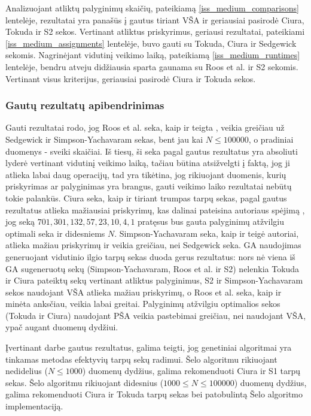 \documentclass{VUMIFInfKursinis}
\begin{document}
Analizuojant atliktų palyginimų skaičių, pateikiamą \ref{iss_medium_comparisons} lentelėje, rezultatai yra panašūs į gautus tiriant VŠA
ir geriausiai pasirodė Ciura, Tokuda ir S2 sekos.
Vertinant atliktus priskyrimus, geriausi rezultatai, pateikiami \ref{iss_medium_assignments} lentelėje, buvo gauti su Tokuda, Ciura ir Sedgewick sekomis.
Nagrinėjant vidutinį veikimo laiką, pateikiamą \ref{iss_medium_runtimes} lentelėje, bendru atveju didžiausia sparta gaunama su Roos et al. ir S2 sekomis.
Vertinant visus kriterijus, geriausiai pasirodė Ciura ir Tokuda sekos.

\subsubsection{Gautų rezultatų apibendrinimas}

Gauti rezultatai rodo, jog Roos et al. seka, kaip ir teigta \cite{roos2002genetic},
veikia greičiau už Sedgewick ir Simpson-Yachavaram sekas, bent jau kai $N \leq 100000$, o pradiniai duomenys - sveiki skaičiai.
Iš tiesų, ši seka pagal gautus rezultatus yra absoliuti lyderė vertinant vidutinį veikimo laiką, tačiau būtina atsižvelgti į faktą, jog ji atlieka labai daug operacijų,
tad yra tikėtina, jog rikiuojant duomenis, kurių priskyrimas ar palyginimas yra brangus, gauti veikimo laiko rezultatai nebūtų tokie palankūs.
Ciura seka, kaip ir tiriant trumpas tarpų sekas, pagal gautus rezultatus atlieka mažiausiai priskyrimų, kas dalinai pateisina autoriaus spėjimą \cite{ciura2001best},
jog seką $701,301,132,57,23,10,4,1$ pratęsus bus gauta palyginimų atžvilgiu optimali seka ir didesniems $N$.
Simpson-Yachavaram seka, kaip ir teigė \cite{simpson1999faster} autoriai, atlieka mažiau priskyrimų ir veikia greičiau, nei Sedgewick seka.
GA naudojimas generuojant vidutinio ilgio tarpų sekas duoda gerus rezultatus: nors nė viena iš GA sugeneruotų sekų (Simpson-Yachavaram, Roos et al. ir S2) nelenkia Tokuda ir Ciura pateiktų sekų
vertinant atliktus palyginimus, S2 ir Simpson-Yachavaram sekos naudojant VŠA atlieka mažiau priskyrimų, o Roos et al. seka, kaip ir minėta anksčiau, veikia labai greitai. 
Palyginimų atžvilgiu optimalios sekos (Tokuda ir Ciura) naudojant PŠA veikia pastebimai greičiau, nei naudojant VŠA, ypač augant duomenų dydžiui.


Įvertinant darbe gautus rezultatus, galima teigti, jog genetiniai algoritmai yra tinkamas metodas efektyvių tarpų sekų radimui.
Šelo algoritmu rikiuojant nedidelius ($N \leq 1000$) duomenų dydžius, galima rekomenduoti Ciura ir S1 tarpų sekas.
Šelo algoritmu rikiuojant didesnius ($1000 \leq N \leq 100000$) duomenų dydžius, galima rekomenduoti Ciura ir Tokuda tarpų sekas bei patobulintą Šelo algoritmo implementaciją.
\end{document}
